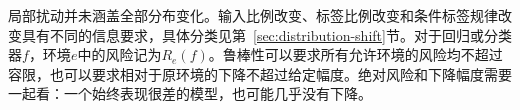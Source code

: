 局部扰动并未涵盖全部分布变化。输入比例改变、标签比例改变和条件标签规律改变具有不同的信息要求，具体分类见第~\ref{sec:distribution-shift}节。对于回归或分类器$f$，环境$e$中的风险记为$R_e(f)$。鲁棒性可以要求所有允许环境的风险均不超过容限，也可以要求相对于原环境的下降不超过给定幅度。绝对风险和下降幅度需要一起看：一个始终表现很差的模型，也可能几乎没有下降。

